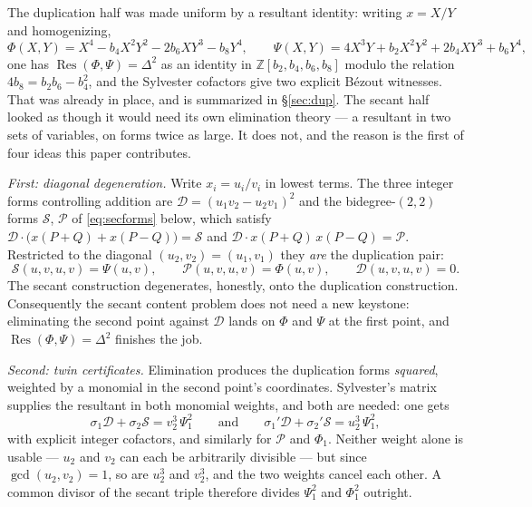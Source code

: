 \documentclass[11pt,reqno]{amsart}
\theoremstyle{plain}
\theoremstyle{definition}
\theoremstyle{remark}
\DeclareMathOperator{\Res}{Res}
\newcommand{\DDz}{\mathcal{D}}
\newcommand{\Sfz}{\mathcal{S}}
\newcommand{\Prz}{\mathcal{P}}
\begin{document}
The duplication half was made uniform by a resultant identity: writing
$x = X/Y$ and homogenizing,
\begin{equation}\label{eq:PhiPsi}
  \Phi(X,Y) = X^4 - b_4X^2Y^2 - 2b_6XY^3 - b_8Y^4, \qquad
  \Psi(X,Y) = 4X^3Y + b_2X^2Y^2 + 2b_4XY^3 + b_6Y^4,
\end{equation}
one has $\Res(\Phi,\Psi) = \Delta^2$ as an identity in
$\mathbb{Z}[b_2,b_4,b_6,b_8]$ modulo the relation
$4b_8 = b_2b_6 - b_4^2$, and the Sylvester cofactors give two explicit
B\'ezout witnesses. That was already in place, and is summarized in
\S\ref{sec:dup}. The secant half looked as though it would need its own
elimination theory --- a resultant in two sets of variables, on forms
twice as large. It does not, and the reason is the first of four ideas
this paper contributes.

\emph{First: diagonal degeneration.} Write $x_i = u_i/v_i$ in lowest
terms. The three integer forms controlling addition are
$\DDz = (u_1v_2 - u_2v_1)^2$ and the bidegree-$(2,2)$ forms $\Sfz$,
$\Prz$ of \eqref{eq:secforms} below, which satisfy
$\DDz\cdot\bigl(x(P{+}Q) + x(P{-}Q)\bigr) = \Sfz$ and
$\DDz\cdot x(P{+}Q)\,x(P{-}Q) = \Prz$. Restricted to the diagonal
$(u_2,v_2) = (u_1,v_1)$ they \emph{are} the duplication pair:
\begin{equation}\label{eq:diag}
  \Sfz(u,v,u,v) = \Psi(u,v), \qquad
  \Prz(u,v,u,v) = \Phi(u,v), \qquad
  \DDz(u,v,u,v) = 0 .
\end{equation}
The secant construction degenerates, honestly, onto the duplication
construction. Consequently the secant content problem does not need a
new keystone: eliminating the second point against $\DDz$ lands on
$\Phi$ and $\Psi$ at the first point, and $\Res(\Phi,\Psi) = \Delta^2$
finishes the job.

\emph{Second: twin certificates.} Elimination produces the duplication
forms \emph{squared}, weighted by a monomial in the second point's
coordinates. Sylvester's matrix supplies the resultant in both monomial
weights, and both are needed: one gets
\[
  \sigma_1\DDz + \sigma_2\Sfz = v_2^3\,\Psi_1^2
  \qquad\text{and}\qquad
  \sigma_1'\DDz + \sigma_2'\Sfz = u_2^3\,\Psi_1^2,
\]
with explicit integer cofactors, and similarly for $\Prz$ and $\Phi_1$.
Neither weight alone is usable --- $u_2$ and $v_2$ can each be
arbitrarily divisible --- but since $\gcd(u_2,v_2) = 1$, so are
$u_2^3$ and $v_2^3$, and the two weights cancel each other. A common
divisor of the secant triple therefore divides $\Psi_1^2$ and
$\Phi_1^2$ outright.
\end{document}
